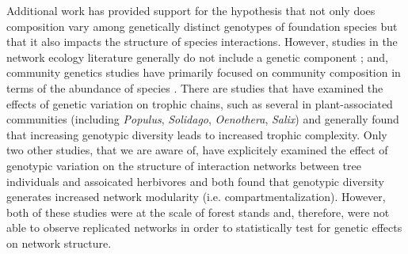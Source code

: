 \documentclass[11pt,twocolumn,twoside,lineno]{pnas-new}
\begin{document}
Additional work has provided support for the hypothesis that not only
does composition vary among genetically distinct genotypes of
foundation species but that it also impacts the structure of species
interactions. However, studies in the network ecology literature
generally do not include a genetic component \cite{Lau2017a}; and,
community genetics studies have primarily focused on community
composition in terms of the abundance of species
\cite{DesRoches2018TheVariation}. There are studies that have examined
the effects of genetic variation on trophic chains, such as several in
plant-associated communities (including \textit{Populus},
\textit{Solidago}, \textit{Oenothera}, \textit{Salix})
\cite{Bailey2005ImportanceInteractions, Johnson2008, Smith2011,
  Smith2015b, Barbour2016GeneticComplexity} and generally found that
increasing genotypic diversity leads to increased trophic
complexity. Only two other studies, that we are aware of, have
explicitely examined the effect of genotypic variation on the
structure of interaction networks between tree individuals and
assoicated herbivores \cite{Lau2015a, Keith2017} and both found that
genotypic diversity generates increased network modularity
(i.e. compartmentalization). However, both of these studies were at
the scale of forest stands and, therefore, were not able to observe
replicated networks in order to statistically test for genetic effects
on network structure.


\end{document}
